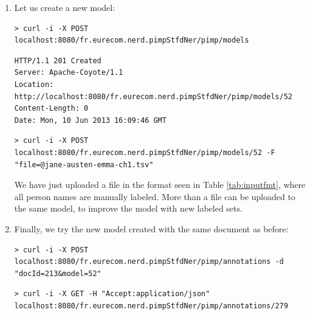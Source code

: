 \documentclass[a4paper,11pt]{report}
\newcommand{\shell}{\noindent\texttt}
\begin{document}
\begin{enumerate}
\begin{lstlisting}
> curl -i -X GET -H "Accept:application/json" localhost:8080/fr.eurecom.nerd.pimpStfdNer/pimp/annotations/278
\end{lstlisting}
\begin{lstlisting}
HTTP/1.1 200 OK
Server: Apache-Coyote/1.1
Content-Type: application/json
Transfer-Encoding: chunked
Date: Mon, 10 Jun 2013 15:24:33 GMT
\end{lstlisting}
\begin{lstlisting}[language=json]
{"token":[{"label":"O","word":"Emma"},{"label":"O","word":"and"},{"label":"PERSON","word":"Elizabeth"},{"label":"O","word":"shared"},{"label":"O","word":"a"},{"label":"O","word":"dream"},{"label":"O","word":"."}]}
\end{lstlisting}
We see that the default model does not correctly label ``Emma'', while Elizabeth is correctly tagged as \texttt{PERSON}.
\item Let us create a new model:
\begin{lstlisting}
> curl -i -X POST localhost:8080/fr.eurecom.nerd.pimpStfdNer/pimp/models
\end{lstlisting}
\begin{lstlisting}
HTTP/1.1 201 Created
Server: Apache-Coyote/1.1
Location: http://localhost:8080/fr.eurecom.nerd.pimpStfdNer/pimp/models/52
Content-Length: 0
Date: Mon, 10 Jun 2013 16:09:46 GMT
\end{lstlisting}
\begin{lstlisting}
> curl -i -X POST localhost:8080/fr.eurecom.nerd.pimpStfdNer/pimp/models/52 -F "file=@jane-austen-emma-ch1.tsv"
\end{lstlisting}
We have just uploaded a file in the format seen in Table \ref{tab:inputfmt}, where all person names are manually labeled. More than a file can be uploaded to the same model, to improve the model with new labeled sets.
\item Finally, we try the new model created with the same document as before:
\begin{lstlisting}
> curl -i -X POST localhost:8080/fr.eurecom.nerd.pimpStfdNer/pimp/annotations -d "docId=213&model=52"
\end{lstlisting}
\begin{lstlisting}
> curl -i -X GET -H "Accept:application/json" localhost:8080/fr.eurecom.nerd.pimpStfdNer/pimp/annotations/279
\end{lstlisting}

\end{enumerate}
\end{document}
